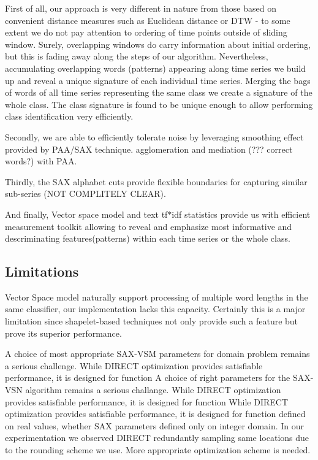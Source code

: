 \documentclass{llncs}
\begin{document}
First of all, our approach is very different in nature from those 
based on convenient distance measures such as Euclidean distance or DTW - to some 
extent we do not pay attention to ordering of time points outside of sliding window. 
Surely, overlapping windows do carry information about initial ordering, but this 
is fading away along the steps of our algorithm. Nevertheless, accumulating overlapping words
(patterns) appearing along time series we build up and reveal a unique signature of each individual
time series. Merging the bags of words of all time series representing the same class we create a
signature of the whole class.  The class signature is found to be unique enough to allow performing
class identification very efficiently.    

Secondly, we are able to efficiently tolerate noise by leveraging smoothing effect provided by
PAA/SAX technique.     agglomeration and mediation (??? correct words?)  with PAA.

Thirdly, the SAX alphabet cuts provide flexible boundaries for capturing similar 
sub-series (NOT COMPLITELY CLEAR).

And finally, Vector space model and text {tf$\ast$idf} statistics provide us 
with efficient measurement toolkit allowing to reveal and emphasize most informative and
descriminating features(patterns) within each time series or the whole class.       

\subsection{Limitations}
Vector Space model naturally support processing of multiple word lengths in the same
classifier, our implementation lacks this capacity. Certainly this is a
major limitation since shapelet-based techniques \cite{bagnal} not only provide such a feature
but prove its superior performance.

A choice of most appropriate SAX-VSM parameters for domain problem remains a serious challenge. 
While DIRECT optimization provides satisfiable performance, it is designed for function
A choice of right parameters for the SAX-VSN algorithm remains a serious challange. While DIRECT
optimization provides satisfiable performance, it is designed for function
While DIRECT optimization provides satisfiable performance, it is designed for function
defined on real values, whether SAX parameters defined only on integer domain. In our
experimentation we observed DIRECT redundantly sampling same locations due to the rounding scheme
we use. More appropriate optimization scheme is needed.
\end{document}
